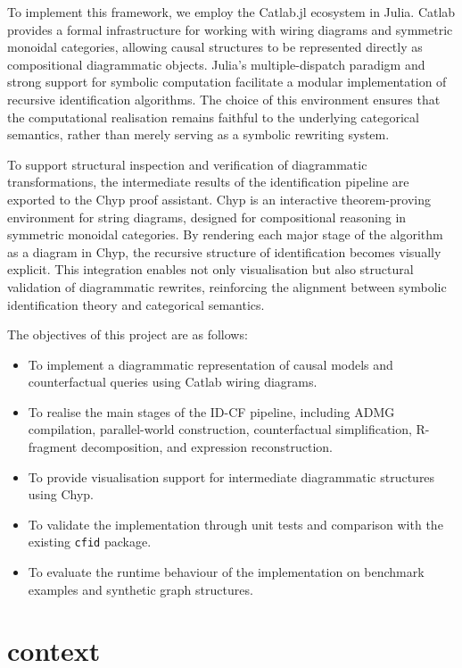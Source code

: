 \documentclass[a4paper]{report}
\begin{document}
To implement this framework, we employ the Catlab.jl ecosystem in Julia. Catlab provides a formal infrastructure for working with wiring diagrams and symmetric monoidal categories, allowing causal structures to be represented directly as compositional diagrammatic objects. Julia’s multiple-dispatch paradigm and strong support for symbolic computation facilitate a modular implementation of recursive identification algorithms. The choice of this environment ensures that the computational realisation remains faithful to the underlying categorical semantics, rather than merely serving as a symbolic rewriting system.

To support structural inspection and verification of diagrammatic transformations, the intermediate results of the identification pipeline are exported to the Chyp proof assistant. Chyp is an interactive theorem-proving environment for string diagrams, designed for compositional reasoning in symmetric monoidal categories. By rendering each major stage of the algorithm as a diagram in Chyp, the recursive structure of identification becomes visually explicit. This integration enables not only visualisation but also structural validation of diagrammatic rewrites, reinforcing the alignment between symbolic identification theory and categorical semantics.

The objectives of this project are as follows:

\begin{itemize}
    \item To implement a diagrammatic representation of causal models and counterfactual queries using Catlab wiring diagrams.
    \item To realise the main stages of the ID-CF pipeline, including ADMG compilation, parallel-world construction, counterfactual simplification, R-fragment decomposition, and expression reconstruction.
    \item To provide visualisation support for intermediate diagrammatic structures using Chyp.
    \item To validate the implementation through unit tests and comparison with the existing \texttt{cfid} package.
    \item To evaluate the runtime behaviour of the implementation on benchmark examples and synthetic graph structures.
\end{itemize}


\chapter{context}
\end{document}
